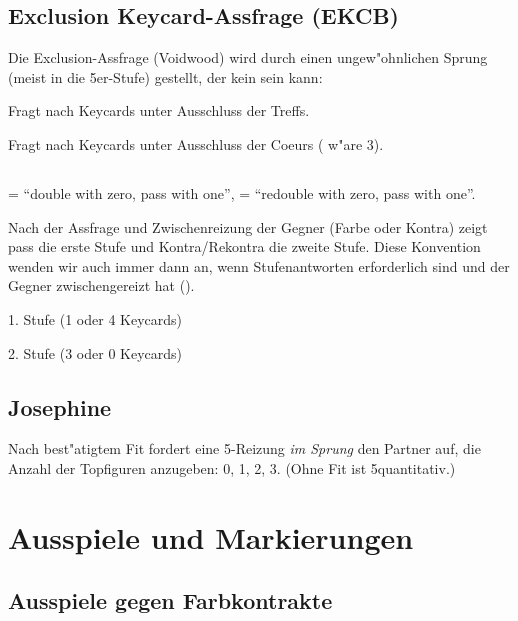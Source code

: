 \subsection{Exclusion Keycard-Assfrage (EKCB)} \label{ekcb}

Die Exclusion-Assfrage (Voidwood) wird durch einen ungew"ohnlichen Sprung
(meist in die 5er-Stufe) gestellt, der kein  sein kann:
%
\bdsc
\item[1\coe{}\sep1\pik; 2\coe{}\sep5\tre] Fragt nach Keycards unter
  Ausschluss der Treffs.
\item[1\tre{}\sep1\kar; 2\kar{}\sep4\coe] Fragt nach Keycards unter
  Ausschluss der Coeurs ( w"are 3\coe).
\edsc

\subsection{}

 = ``double with zero, pass with one'',  =
``redouble with zero, pass with one''.

Nach der Assfrage und Zwischenreizung der Gegner (Farbe oder Kontra) zeigt pass
die erste Stufe und Kontra/Rekontra die zweite Stufe. Diese Konvention wenden
wir auch immer dann an, wenn Stufenantworten erforderlich sind und der Gegner
zwischengereizt hat (\ra {}).
%
\bdsc
  \item[pass] 1. Stufe (1 oder 4 Keycards)
  \item[\kontra/\rekontra] 2. Stufe (3 oder 0 Keycards)
\edsc

\subsection{Josephine} \label{josephine}

Nach best"atigtem Fit fordert eine 5\SA-Reizung \emph{im Sprung} den Partner auf, die Anzahl der
Topfiguren anzugeben: 0, 1, 2, 3. (Ohne Fit ist 5\SA quantitativ.)

\newpage
\section{Ausspiele und Markierungen}

\subsection{Ausspiele gegen Farbkontrakte}

